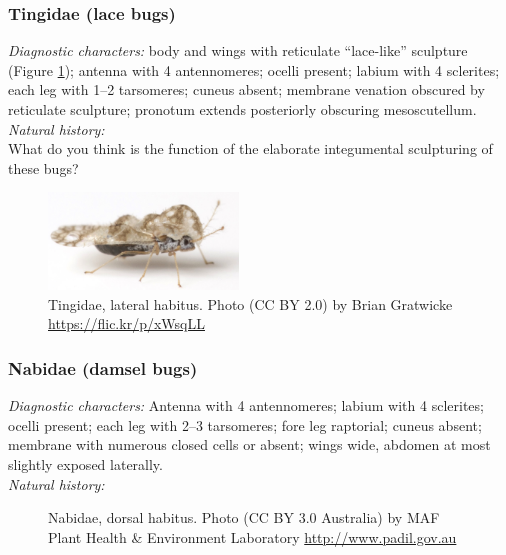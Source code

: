 \documentclass[letterpaper, 11pt]{article}
\begin{document}
\subsubsection{Tingidae (lace bugs)}
\noindent{}\textit{Diagnostic characters:} body and wings with reticulate ``lace-like'' sculpture (Figure \ref{fig:tingid1}); antenna with 4 antennomeres; ocelli present; labium with 4 sclerites;  each leg with 1--2 tarsomeres; cuneus absent; membrane venation obscured by reticulate sculpture; pronotum extends posteriorly obscuring mesoscutellum.\\

\noindent{}\textit{Natural history:} \\

\noindent{}What do you think is the function of the elaborate integumental sculpturing of these bugs?\vspace{3cm}

\begin{figure}[ht!]
 \centering
 \includegraphics[width=0.45\textwidth]{TingidHabitus}
 \caption{Tingidae, lateral habitus. Photo (CC BY 2.0) by Brian Gratwicke \url{https://flic.kr/p/xWsqLL}}
 \label{fig:tingid1}
\end{figure}

\subsubsection{Nabidae (damsel bugs)}
\noindent{}\textit{Diagnostic characters:} Antenna with 4 antennomeres; labium with 4 sclerites; ocelli present; each leg with 2--3 tarsomeres; fore leg raptorial; cuneus absent; membrane with numerous closed cells or absent; wings wide, abdomen at most slightly exposed laterally.\\

\noindent{}\textit{Natural history:} \\

\begin{figure}[ht!]
 \centering
 \caption{Nabidae, dorsal habitus. Photo (CC BY 3.0 Australia) by MAF Plant Health \& Environment Laboratory \url{http://www.padil.gov.au}}
 \label{fig:nabid1}
\end{figure}
\end{document}
